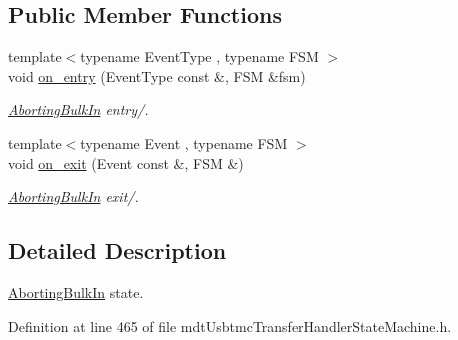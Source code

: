 \subsection*{Public Member Functions}
\begin{DoxyCompactItemize}
\item 
{\footnotesize template$<$typename Event\-Type , typename F\-S\-M $>$ }\\void \hyperlink{structmdt_usbtmc_transfer_handler_state_machine_1_1_running___1_1_aborting_bulk_in_a55e054a41a8700f0416cccc7ebc7ca75}{on\-\_\-entry} (Event\-Type const \&, F\-S\-M \&fsm)
\begin{DoxyCompactList}\small\item\em \hyperlink{structmdt_usbtmc_transfer_handler_state_machine_1_1_running___1_1_aborting_bulk_in}{Aborting\-Bulk\-In} entry/. \end{DoxyCompactList}\item 
{\footnotesize template$<$typename Event , typename F\-S\-M $>$ }\\void \hyperlink{structmdt_usbtmc_transfer_handler_state_machine_1_1_running___1_1_aborting_bulk_in_a090ceb43bcd2609306f7f4e8cfe9153e}{on\-\_\-exit} (Event const \&, F\-S\-M \&)
\begin{DoxyCompactList}\small\item\em \hyperlink{structmdt_usbtmc_transfer_handler_state_machine_1_1_running___1_1_aborting_bulk_in}{Aborting\-Bulk\-In} exit/. \end{DoxyCompactList}\end{DoxyCompactItemize}


\subsection{Detailed Description}
\hyperlink{structmdt_usbtmc_transfer_handler_state_machine_1_1_running___1_1_aborting_bulk_in}{Aborting\-Bulk\-In} state. 

Definition at line 465 of file mdt\-Usbtmc\-Transfer\-Handler\-State\-Machine.\-h.



